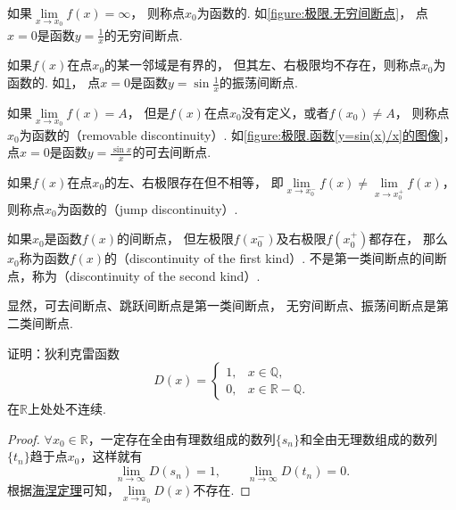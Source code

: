 \begin{figure}[ht]
	\centering
	\caption{}
	\label{figure:极限.振荡间断点}
\end{figure}

如果\(\lim\limits_{x \to x_0}f(x) = \infty\)，
则称点\(x_0\)为函数的.
如\cref{figure:极限.无穷间断点}，
点\(x=0\)是函数\(y=\frac{1}{x}\)的无穷间断点.

如果\(f(x)\)在点\(x_0\)的某一邻域是有界的，
但其左、右极限均不存在，则称点\(x_0\)为函数的.
如\cref{figure:极限.振荡间断点}，
点\(x=0\)是函数\(y=\sin\frac{1}{x}\)的振荡间断点.

如果\(\lim\limits_{x \to x_0}f(x) = A\)，
但是\(f(x)\)在点\(x_0\)没有定义，或者\(f(x_0) \neq A\)，
则称点\(x_0\)为函数的（removable discontinuity）.
如\cref{figure:极限.函数[y=sin(x)/x]的图像}，
点\(x=0\)是函数\(y=\frac{\sin x}{x}\)的可去间断点.

如果\(f(x)\)在点\(x_0\)的左、右极限存在但不相等，
即\(\lim\limits_{x \to x_0^-}f(x) \neq \lim\limits_{x \to x_0^+}f(x)\)，
则称点\(x_0\)为函数的（jump discontinuity）.

如果\(x_0\)是函数\(f(x)\)的间断点，
但左极限\(f(x_0^-)\)及右极限\(f(x_0^+)\)都存在，
那么\(x_0\)称为函数\(f(x)\)的（discontinuity of the first kind）.
不是第一类间断点的间断点，称为（discontinuity of the second kind）.

显然，可去间断点、跳跃间断点是第一类间断点，
无穷间断点、振荡间断点是第二类间断点.

\begin{example}\label{example:极限.狄利克雷函数在实数域上处处不连续}
证明：狄利克雷函数\[
D(x) = \left\{ \begin{array}{ll}
1, & x \in \mathbb{Q}, \\
0, & x \in \mathbb{R} - \mathbb{Q}.
\end{array} \right.
\]在\(\mathbb{R}\)上处处不连续.
\begin{proof}
\(\forall x_0 \in \mathbb{R}\)，一定存在全由有理数组成的数列\(\{s_n\}\)和全由无理数组成的数列\(\{t_n\}\)趋于点\(x_0\)，这样就有\[
\lim\limits_{n\to\infty} D(s_n) = 1,
\qquad
\lim\limits_{n\to\infty} D(t_n) = 0.
\]
根据\hyperref[theorem:极限.海涅定理]{海涅定理}可知，\(\lim\limits_{x \to x_0} D(x)\)不存在.
\end{proof}
\end{example}

